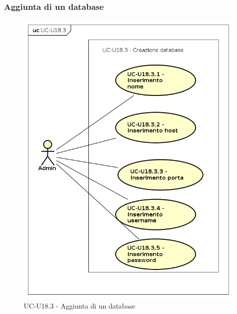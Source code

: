 \subsubsection{Aggiunta di un database}

    \begin{figure}[H]
      \begin{center}
        \includegraphics[width=12cm]{res/img/UCUtenti/UCUtenteA/UC-U18-OperazioniDatabase/UC-U18.3-CreazioneDatabase.png}
      \caption{UC-U18.3 - Aggiunta di un database}
      \end{center} 
    \end{figure}    
    
